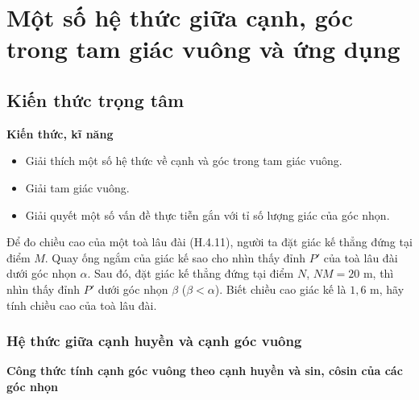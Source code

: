 
\section{Một số hệ thức giữa cạnh, góc trong tam giác vuông và ứng dụng}

\begin{lesson}
    \subsection{Kiến thức trọng tâm}

    \textbf{Kiến thức, kĩ năng}
    \begin{itemize}
        \item Giải thích một số hệ thức về cạnh và góc trong tam giác vuông.
        \item Giải tam giác vuông.
        \item Giải quyết một số vấn đề thực tiễn gắn với tỉ số lượng giác của góc nhọn.
    \end{itemize}

    Để đo chiều cao của một toà lâu đài (H.4.11), người ta đặt giác kế thẳng đứng tại điểm $M$. Quay ống ngắm của giác kế sao cho nhìn thấy đỉnh $P'$ của toà lâu đài dưới góc nhọn $\alpha$. Sau đó, đặt giác kế thẳng đứng tại điểm $N$, $NM=20$ m, thì nhìn thấy đỉnh $P'$ dưới góc nhọn $\beta$ ($\beta<\alpha$). Biết chiều cao giác kế là $1{,}6$ m, hãy tính chiều cao của toà lâu đài.


    \subsubsection{Hệ thức giữa cạnh huyền và cạnh góc vuông}

    \textbf{Công thức tính cạnh góc vuông theo cạnh huyền và sin, côsin của các góc nhọn}


\end{lesson}
